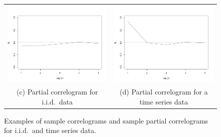 \begin{itemize}
\begin{figure}[ht!]
\begin{center}
\begin{tabular}{cc}
\includegraphics[scale=0.25]{./figures/PreliminariesPartialCorrelogramGaussian} &
\includegraphics[scale=0.25]{./figures/PreliminariesPartialCorrelogramTimeSerie} \\
\small (c) Partial correlogram for i.i.d.\ data & (d) \small Partial correlogram for a time series data \\
\end{tabular}
\caption{\label{Figure:PreliminariesCorrelograms} Examples of sample correlograms and sample partial correlograms for i.i.d.\ and time series data. 
}
\end{center}
\end{figure}

\end{itemize}

